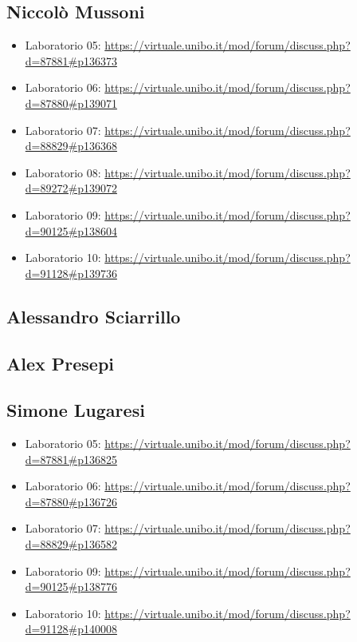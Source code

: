 \documentclass[a4paper,12pt]{report}
\begin{document}
\subsection*{Niccolò Mussoni}
\begin{itemize}
	\item Laboratorio 05: \url{https://virtuale.unibo.it/mod/forum/discuss.php?d=87881#p136373}
	\item Laboratorio 06: \url{https://virtuale.unibo.it/mod/forum/discuss.php?d=87880#p139071}
	\item Laboratorio 07: \url{https://virtuale.unibo.it/mod/forum/discuss.php?d=88829#p136368}
	\item Laboratorio 08: \url{https://virtuale.unibo.it/mod/forum/discuss.php?d=89272#p139072}
	\item Laboratorio 09: \url{https://virtuale.unibo.it/mod/forum/discuss.php?d=90125#p138604}
	\item Laboratorio 10: \url{https://virtuale.unibo.it/mod/forum/discuss.php?d=91128#p139736}
\end{itemize}

\subsection*{Alessandro Sciarrillo}
\subsection*{Alex Presepi}
\subsection*{Simone Lugaresi}
\begin{itemize}
	\item Laboratorio 05: \url{https://virtuale.unibo.it/mod/forum/discuss.php?d=87881#p136825}
	\item Laboratorio 06: \url{https://virtuale.unibo.it/mod/forum/discuss.php?d=87880#p136726}
	\item Laboratorio 07: \url{https://virtuale.unibo.it/mod/forum/discuss.php?d=88829#p136582}
	\item Laboratorio 09: \url{https://virtuale.unibo.it/mod/forum/discuss.php?d=90125#p138776}
	\item Laboratorio 10: \url{https://virtuale.unibo.it/mod/forum/discuss.php?d=91128#p140008}
\end{itemize}

\tableofcontents
\end{document}
